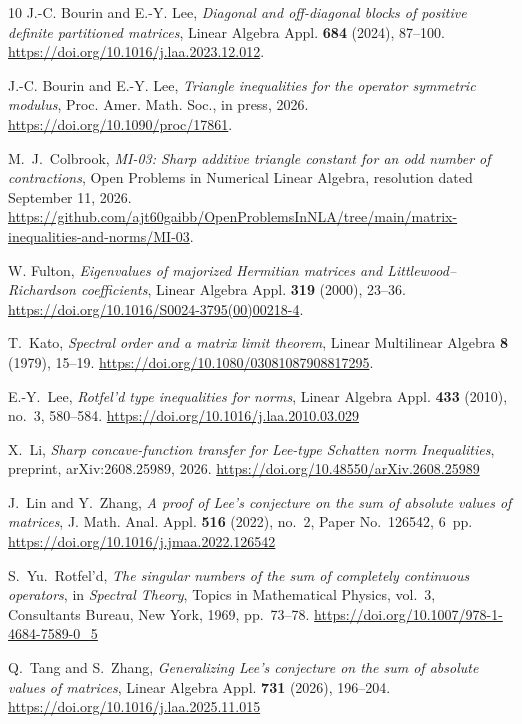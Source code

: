 \documentclass[11pt]{amsart}
\numberwithin{equation}{section}
\begin{document}
\begin{thebibliography}{10}
J.-C. Bourin and E.-Y. Lee,
\emph{Diagonal and off-diagonal blocks of positive definite partitioned matrices},
Linear Algebra Appl. \textbf{684} (2024), 87--100.
\url{https://doi.org/10.1016/j.laa.2023.12.012}.

J.-C. Bourin and E.-Y. Lee,
\emph{Triangle inequalities for the operator symmetric modulus},
Proc. Amer. Math. Soc., in press, 2026.
\url{https://doi.org/10.1090/proc/17861}.


M.~J.~Colbrook,
\emph{MI-03: Sharp additive triangle constant for an odd number
of contractions},
Open Problems in Numerical Linear Algebra,
resolution dated September 11, 2026.
\url{https://github.com/ajt60gaibb/OpenProblemsInNLA/tree/main/matrix-inequalities-and-norms/MI-03}.

W. Fulton,
\emph{Eigenvalues of majorized Hermitian matrices and Littlewood--Richardson coefficients},
Linear Algebra Appl. \textbf{319} (2000), 23--36.
\url{https://doi.org/10.1016/S0024-3795(00)00218-4}.


T.~Kato,
\emph{Spectral order and a matrix limit theorem},
Linear Multilinear Algebra \textbf{8} (1979), 15--19.
\url{https://doi.org/10.1080/03081087908817295}.


E.-Y.~Lee,
\emph{Rotfel'd type inequalities for norms},
Linear Algebra Appl. \textbf{433} (2010), no.~3, 580--584.
\url{https://doi.org/10.1016/j.laa.2010.03.029}

 X.~Li, \emph{Sharp concave-function transfer for Lee-type
Schatten norm Inequalities}, preprint, arXiv:2608.25989, 2026.
\url{https://doi.org/10.48550/arXiv.2608.25989}

J.~Lin and Y.~Zhang,
\emph{A proof of Lee's conjecture on the sum of absolute values of matrices},
J. Math. Anal. Appl. \textbf{516} (2022), no.~2, Paper No.~126542, 6~pp.
\url{https://doi.org/10.1016/j.jmaa.2022.126542}

S.~Yu.~Rotfel'd,
\emph{The singular numbers of the sum of completely continuous operators},
in \emph{Spectral Theory}, Topics in Mathematical Physics, vol.~3,
Consultants Bureau, New York, 1969, pp.~73--78.
\url{https://doi.org/10.1007/978-1-4684-7589-0_5}

Q.~Tang and S.~Zhang,
\emph{Generalizing Lee's conjecture on the sum of absolute values of matrices},
Linear Algebra Appl. \textbf{731} (2026), 196--204.
\url{https://doi.org/10.1016/j.laa.2025.11.015}



\end{thebibliography}
\end{document}
